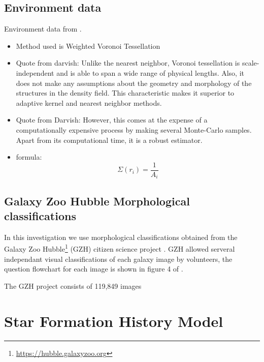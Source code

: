 \documentclass[a4paper,fleqn,usenatbib]{mnras}
\begin{document}
   

   \subsection{Environment data}
   
   Environment data from \cite{darvish2015}.

   \begin{itemize}
      \item Method used is Weighted Voronoi Tessellation
      \item  Quote from darvish: Unlike the nearest neighbor, Voronoi tessellation is scale-independent and is able to span a wide range of physical lengths. Also, it
does not make any assumptions about the geometry and
morphology of the structures in the density field. This
characteristic makes it superior to adaptive kernel and
nearest neighbor methods.

       \item  Quote from Darvish: However, this comes at the expense
of a computationally expensive process by
making several Monte-Carlo samples. Apart from
its computational time, it is a robust estimator.

      \item formula: \begin{equation}\Sigma(r_{i})=\frac{1}{A_{i}}\end{equation}
   \end{itemize}


   \subsection{Galaxy Zoo Hubble Morphological classifications}
   
   In this investigation we use morphological classifications obtained from the Galaxy Zoo Hubble\footnote{\url{https://hubble.galaxyzoo.org}} (GZH) citizen 
   science project \citep{galaxyzooHubble}. GZH allowed serveral independant visual classifications of each galaxy image by volunteers, the question flowchart for each
   image is shown in figure 4 of \cite{galaxyzooHubble}.

   The GZH project consists of 119,849 images 
   
\section{Star Formation History Model}
\end{document}
